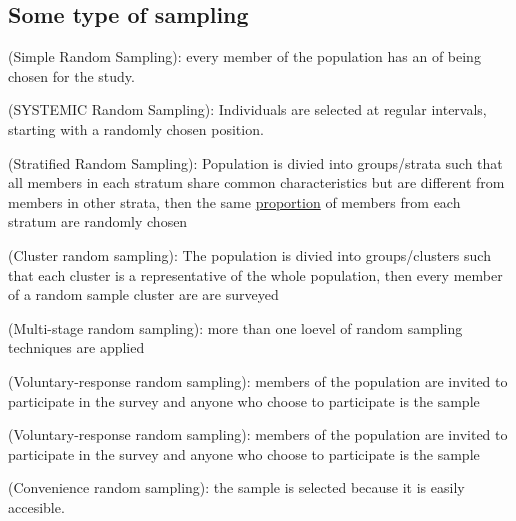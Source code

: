 \subsection{Some type of sampling}
\begin{definition}
    (Simple Random Sampling): every member of the population has an  of being chosen for the study.
\end{definition}

\begin{definition}
    (SYSTEMIC Random Sampling): Individuals are selected at regular intervals, starting with a randomly chosen position.
\end{definition}

\begin{definition}
    (Stratified Random Sampling): Population is divied into groups/strata such that all members in each stratum share common
    characteristics but are different from members in other strata, then the same \underline{proportion} of members from each 
    stratum are randomly chosen 
\end{definition}

\begin{definition}
    (Cluster random sampling): The population is divied into groups/clusters such that each cluster is a 
    representative of the whole population, then every member of a random sample cluster are are surveyed
\end{definition}

\begin{definition}
    (Multi-stage random sampling): more than one loevel of random sampling techniques are applied
\end{definition}

\begin{definition}
    (Voluntary-response random sampling): members of the population are invited to participate in the survey and 
    anyone who choose to participate is the sample
\end{definition}

\begin{definition}
    (Voluntary-response random sampling): members of the population are invited to participate in the survey and 
    anyone who choose to participate is the sample
\end{definition}

\begin{definition}
    (Convenience random sampling): the sample is selected because it is easily accesible. 
\end{definition}

